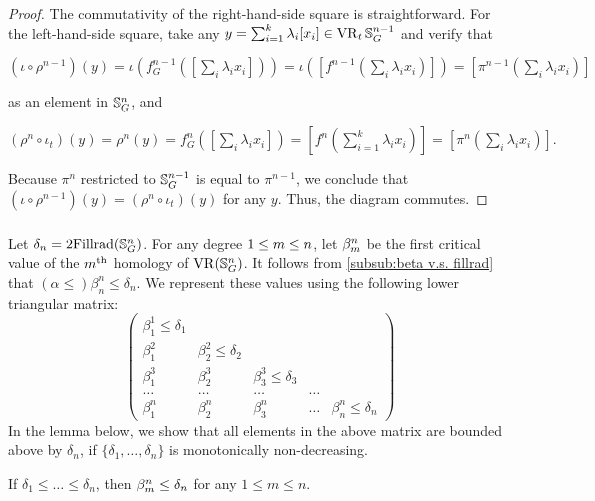 \begin{proof}
	The commutativity of the right-hand-side square is straightforward.
	For the left-hand-side square, take any $y = \sum_{i=1}^k \lambda_i [x_i] \in \operatorname{VR}_t\mathbb{S}^{n-1}_G$ and verify that
	\begin{center}
		$(\iota \circ \rho^{n-1})(y)
		=\iota(f^{n-1}_G([\sum_i \lambda_i x_i]))
		=\iota([f^{n-1}(\sum_i \lambda_i x_i)])
		=[\pi^{n-1}(\sum_i \lambda_i x_i)]
		$
	\end{center}
	as an element in $\mathbb{S}^n_G$, and
	\begin{center}
		$(\rho^{n} \circ \iota_t)(y) = \rho^{n}(y) = f^{n}_G([\sum_i \lambda_i x_i]) = [f^{n}(\sum_{i=1}^k \lambda_i x_i)] = [\pi^{n}(\sum_i \lambda_i x_i)].
		$
	\end{center}
	Because $\pi^{n}$ restricted to $\mathbb{S}^{n-1}_G$ is equal to $\pi^{n-1}$, we conclude that $(\iota \circ \rho^{n-1})(y) = (\rho^n \circ \iota_t)(y)$ for any $y$.
	Thus, the diagram commutes.
\end{proof}

\subsubsection{}\label{subsub:foundamental_bar_rpn_lemma}

Let $\delta_n=2\mathrm{Fillrad}(\mathbb{S}^n_G)$.
For any degree $1 \leq m \leq n$, let $\beta_{m}^{n}$ be the first critical value of the $m^{\mathrm{th}}$ homology of $\operatorname{VR}(\mathbb{S}^n_G)$.
It follows from \cref{subsub:beta v.s. fillrad} that $(\alpha \leq) \beta_{n}^{n} \leq \delta_n$.
We represent these values using the following lower triangular matrix:
\[
\begin{pmatrix}
	\beta_{1}^{1}\leq \delta_1 & & &&\\
	\beta_1^2 & \beta_{2}^{2} \leq \delta_2 & &&\\
	\beta_1^3 & \beta_{2}^{3} & \beta_{3}^{3} \leq \delta_3 &&\\
	\dots & \dots & \dots & \dots &\\
	\beta_1^n & \beta_2^n & \beta_3^n & \dots & \beta_n^n \leq \delta_n
\end{pmatrix}
\]
In the lemma below, we show that all elements in the above matrix are bounded above by $\delta_n$, if $\{\delta_1, \dots, \delta_n\}$ is monotonically non-decreasing.

\medskip\lemma
If $\delta_1 \leq \dots \leq \delta_n$, then $\beta_{m}^{n} \leq \delta_n$ for any $1 \leq m \leq n$.

